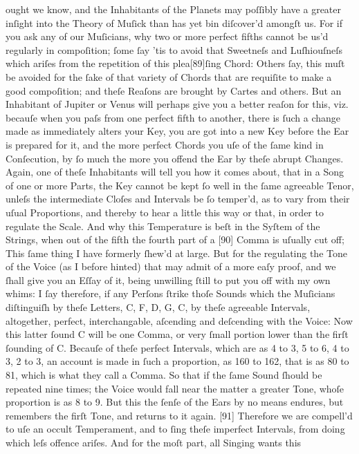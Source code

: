 \documentclass[letterpaper]{book}
\begin{document}
ought we know, and the Inhabitants of the Planets may poſſibly have a
greater inſight into the Theory of Muſick than has yet bin diſcover'd
amongſt us. For if you ask any of our Muſicians, why two or more perfect
fifths cannot be us'd regularly in compoſition; ſome ſay 'tis to avoid that
Sweetneſs and Luſhiouſneſs which ariſes from the repetition of this
plea[89]ſing Chord: Others ſay, this muſt be avoided for the ſake of that
variety of Chords that are requiſite to make a good compoſition; and theſe
Reaſons are brought by Cartes and others.  But an Inhabitant of Jupiter or
Venus will perhaps give you a better reaſon for this, viz. becauſe when you
paſs from one perfect fifth to another, there is ſuch a change made as
immediately alters your Key, you are got into a new Key before the Ear is
prepared for it, and the more perfect Chords you uſe of the ſame kind in
Conſecution, by ſo much the more you offend the Ear by theſe abrupt
Changes.  Again, one of theſe Inhabitants will tell you how it comes about,
that in a Song of one or more Parts, the Key cannot be kept ſo well in the
ſame agreeable Tenor, unleſs the intermediate Cloſes and Intervals be ſo
temper'd, as to vary from their uſual Proportions, and thereby to hear a
little this way or that, in order to regulate the Scale. And why this
Temperature is beſt in the Syſtem of the Strings, when out of the fifth the
fourth part of a [90] Comma is uſually cut off; This ſame thing I have
formerly ſhew'd at large.  But for the regulating the Tone of the Voice (as I
before hinted) that may admit of a more eaſy proof, and we ſhall give you an
Eſſay of it, being unwilling ſtill to put you off with my own whims: I ſay
therefore, if any Perſons ſtrike thoſe Sounds which the Muſicians
diſtinguiſh by theſe Letters, C, F, D, G, C, by theſe agreeable Intervals,
altogether, perfect, interchangable, aſcending and deſcending with the
Voice: Now this latter ſound C will be one Comma, or very ſmall portion
lower than the firſt ſounding of C. Becauſe of theſe perfect Intervals,
which are as 4 to 3, 5 to 6, 4 to 3, 2 to 3, an account is made in ſuch a
proportion, as 160 to 162, that is as 80 to 81, which is what they call a
Comma. So that if the ſame Sound ſhould be repeated nine times; the Voice
would fall near the matter a greater Tone, whoſe proportion is as 8 to 9.
But this the ſenſe of the Ears by no means endures, but remembers the firſt
Tone, and returns to it again. [91] Therefore we are compell'd to uſe an
occult Temperament, and to ſing theſe imperfect Intervals, from doing which
leſs offence ariſes. And for the moſt part, all Singing wants this
\end{document}
